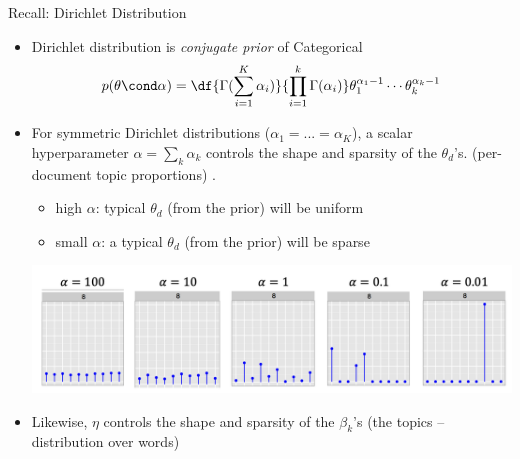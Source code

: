 \documentclass[10pt]{beamer}
\begin{document}
\begin{frame}{Recall: Dirichlet Distribution}

\begin{itemize}
\item Dirichlet distribution is \textit{conjugate prior} of Categorical
\[  p(\theta \cond \alpha)  = \df{\Gamma (\sum_{i=1}^K \alpha_i)}{ \prod_{i=1}^k \Gamma(\alpha_i)}  \theta_1^{\alpha_1 -1 } \cdots  \theta_k^{\alpha_k -1 }  \]
\pause 
\item For symmetric Dirichlet distributions ($\alpha_1 = ... = \alpha_K$),  a scalar hyperparameter $\alpha = \sum_k \alpha_k$ controls the shape and sparsity of the $\theta_d$'s. \tiny(per-document topic proportions) \normalsize .   
	\begin{itemize}
	\item high $\alpha$:  typical $\theta_d$ \tiny (from the prior) \normalsize will be uniform
	\item small $\alpha$: a typical $\theta_d$ \tiny (from the prior) \normalsize will be sparse
	\end{itemize}
	\begin{center}
	\includegraphics[width=.8\textwidth]{images/dirichlet_role_of_hyperparameter}
	\end{center} 
\pause 
\item Likewise, $\eta$ controls the shape and sparsity of the $\beta_k$'s \tiny(the topics -- distribution over words) \normalsize
\end{itemize}
\end{frame}
\end{document}
